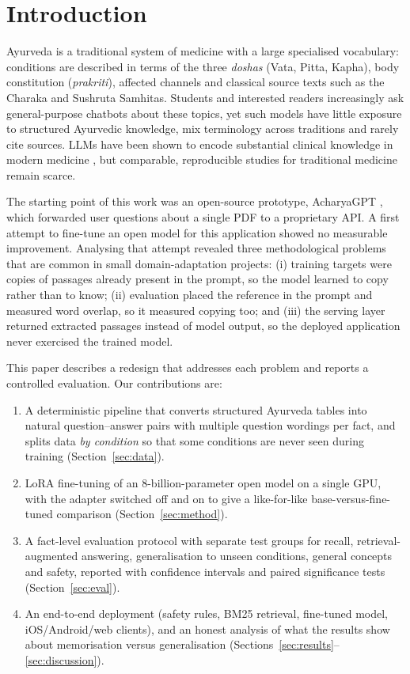 \documentclass[5p,times,authoryear]{elsarticle}
\begin{document}

\section{Introduction}
\label{sec:intro}

Ayurveda is a traditional system of medicine with a large specialised vocabulary: conditions are described in terms of the three \emph{doshas} (Vata, Pitta, Kapha), body constitution (\emph{prakriti}), affected channels and classical source texts such as the Charaka and Sushruta Samhitas. Students and interested readers increasingly ask general-purpose chatbots about these topics, yet such models have little exposure to structured Ayurvedic knowledge, mix terminology across traditions and rarely cite sources. LLMs have been shown to encode substantial clinical knowledge in modern medicine \citep{singhal2023medpalm}, but comparable, reproducible studies for traditional medicine remain scarce.

The starting point of this work was an open-source prototype, AcharyaGPT \citep{acharyagpt2023}, which forwarded user questions about a single PDF to a proprietary API. A first attempt to fine-tune an open model for this application showed no measurable improvement. Analysing that attempt revealed three methodological problems that are common in small domain-adaptation projects: (i) training targets were copies of passages already present in the prompt, so the model learned to copy rather than to know; (ii) evaluation placed the reference in the prompt and measured word overlap, so it measured copying too; and (iii) the serving layer returned extracted passages instead of model output, so the deployed application never exercised the trained model.

This paper describes a redesign that addresses each problem and reports a controlled evaluation. Our contributions are:
\begin{enumerate}
\item A deterministic pipeline that converts structured Ayurveda tables into natural question--answer pairs with multiple question wordings per fact, and splits data \emph{by condition} so that some conditions are never seen during training (Section~\ref{sec:data}).
\item LoRA fine-tuning of an 8-billion-parameter open model on a single GPU, with the adapter switched off and on to give a like-for-like base-versus-fine-tuned comparison (Section~\ref{sec:method}).
\item A fact-level evaluation protocol with separate test groups for recall, retrieval-augmented answering, generalisation to unseen conditions, general concepts and safety, reported with confidence intervals and paired significance tests (Section~\ref{sec:eval}).
\item An end-to-end deployment (safety rules, BM25 retrieval, fine-tuned model, iOS/Android/web clients), and an honest analysis of what the results show about memorisation versus generalisation (Sections~\ref{sec:results}--\ref{sec:discussion}).
\end{enumerate}
\end{document}
